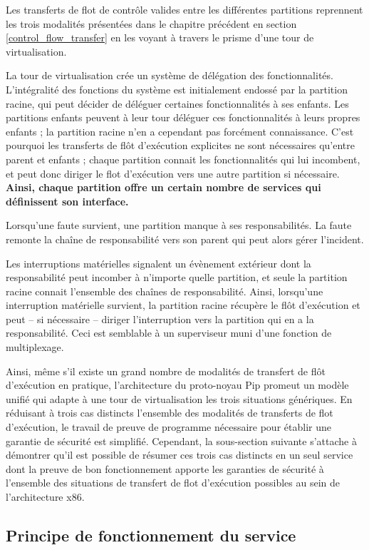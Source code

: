 	Les transferts de flot de contrôle valides entre les différentes partitions reprennent les trois modalités présentées dans le chapitre précédent en section \ref{control_flow_transfer} en les voyant à travers le prisme d'une tour de virtualisation.

	La tour de virtualisation crée un système de délégation des fonctionnalités. L'intégralité des fonctions du système est initialement endossé par la partition racine, qui peut décider de déléguer certaines fonctionnalités à ses enfants. Les partitions enfants peuvent à leur tour déléguer ces fonctionnalités à leurs propres enfants ; la partition racine n'en a cependant pas forcément connaissance. C'est pourquoi les transferts de flôt d'exécution explicites ne sont nécessaires qu'entre parent et enfants ; chaque partition connait les fonctionnalités qui lui incombent, et peut donc diriger le flot d'exécution vers une autre partition si nécessaire. \textbf{Ainsi, chaque partition offre un certain nombre de services qui définissent son interface.}

	Lorsqu'une faute survient, une partition manque à ses responsabilités. La faute remonte la chaîne de responsabilité vers son parent qui peut alors gérer l'incident.

	Les interruptions matérielles signalent un évènement extérieur dont la responsabilité peut incomber à n'importe quelle partition, et seule la partition racine connait l'ensemble des chaînes de responsabilité. Ainsi, lorsqu'une interruption matérielle survient, la partition racine récupère le flôt d'exécution et peut -- si nécessaire -- diriger l'interruption vers la partition qui en a la responsabilité. Ceci est semblable à un superviseur muni d'une fonction de multiplexage.

Ainsi, même s'il existe un grand nombre de modalités de transfert de flôt d'exécution en pratique, l'architecture du proto-noyau Pip promeut un modèle unifié qui adapte à une tour de virtualisation les trois situations génériques. En réduisant à trois cas distincts l'ensemble des modalités de transferts de flot d'exécution, le travail de preuve de programme nécessaire pour établir une garantie de sécurité est simplifié. Cependant, la sous-section suivante s'attache à démontrer qu'il est possible de résumer ces trois cas distincts en un seul service dont la preuve de bon fonctionnement apporte les garanties de sécurité à l'ensemble des situations de transfert de flot d'exécution possibles au sein de l'architecture x86.

	\subsection{Principe de fonctionnement du service} 
	\label{service_idea}


